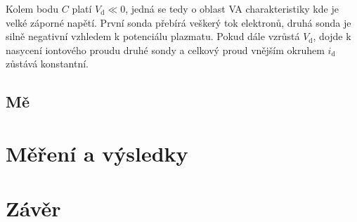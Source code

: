 \documentclass[a4paper,12pt]{article}
\begin{document}
Kolem bodu $C$ platí $V_\text{{d}} \ll 0 $, jedná se tedy
o oblast VA charakteristiky kde je velké záporné napětí.
První sonda přebírá veškerý tok elektronů, druhá sonda
je silně negativní vzhledem k potenciálu plazmatu.
Pokud dále vzrůstá $V_\text{{d}}$, dojde k nasycení
iontového proudu druhé sondy a celkový proud vnějším
okruhem $i_\text{{d}}$ zůstává konstantní.

\subsection{Mě}




\section{Měření a výsledky}


\section{Závěr}
\end{document}
